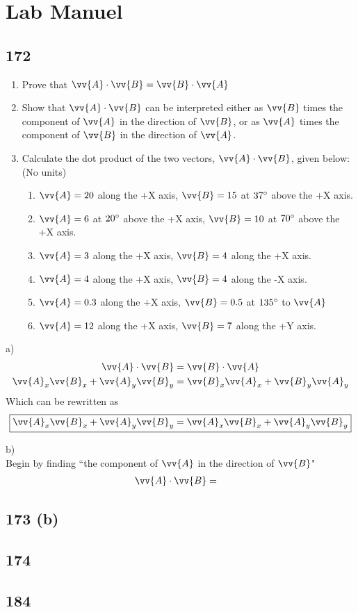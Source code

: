 \documentclass{article}
\begin{document}
\section{Lab Manuel}

\subsection{172}

\begin{enumerate}[label=\alph*)]
    \item Prove that $ \vv{A} \cdot \vv{B} = \vv{B} \cdot \vv{A} $
    \item Show that $ \vv{A} \cdot \vv{B} $ can be interpreted either as $ \vv{B} $ times the component of $ \vv{A} $ in the direction of $ \vv{B} $, or as $ \vv{A} $ times the component of $ \vv{B} $ in the direction of $ \vv{A} $.
    \item Calculate the dot product of the two vectors, $ \vv{A} \cdot \vv{B} $, given below: (No units)
        \begin{enumerate}[label=\arabic*)]
            \item $ \vv{A} = 20 $ along the +X axis, $ \vv{B} = 15 $ at $ 37\degree $ above the +X axis.
            \item $ \vv{A} = 6 $ at $ 20\degree $ above the +X axis, $ \vv{B} = 10 $ at $ 70\degree $ above the +X axis.
            \item $ \vv{A} = 3 $ along the +X axis, $ \vv{B} = 4 $ along the +X axis.
            \item $ \vv{A} = 4 $ along the +X axis, $ \vv{B} = 4 $ along the -X axis.
            \item $ \vv{A} = 0.3 $ along the +X axis, $ \vv{B} = 0.5 $ at $ 135\degree $ to $ \vv{A} $
            \item $ \vv{A} = 12 $ along the +X axis, $ \vv{B} = 7 $ along the +Y axis.
        \end{enumerate}
\end{enumerate}

a)
\begin{align*}
    \vv{A} \cdot \vv{B} & = \vv{B} \cdot \vv{A} \\
    \vv{A}_x\vv{B}_x + \vv{A}_y\vv{B}_y & = \vv{B}_x\vv{A}_x + \vv{B}_y\vv{A}_y
\end{align*}
Which can be rewritten as
\begin{equation*}
    \boxed{
        \vv{A}_x\vv{B}_x + \vv{A}_y\vv{B}_y = \vv{A}_x\vv{B}_x + \vv{A}_y\vv{B}_y
    }
\end{equation*}

b) \\
Begin by finding ``the component of $ \vv{A} $ in the direction of $ \vv{B} $"
\begin{align*}
    \vv{A} \cdot \vv{B} & = 
\end{align*}

\subsection{173 (b)}

\subsection{174}

\subsection{184}
\end{document}
